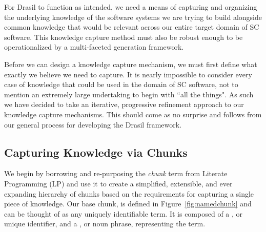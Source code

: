 For Drasil to function as intended, we need a means of capturing and organizing 
the underlying knowledge of the software systems we are trying to build 
alongside common knowledge that would be relevant across our entire target 
domain of SC software. This knowledge capture method must also be robust enough 
to be operationalized by a multi-faceted generation framework.

Before we can design a knowledge capture mechanism, we must first define what 
exactly we believe we need to capture. It is nearly impossible to consider 
every case of knowledge that could be used in the domain of SC software, not to 
mention an extremely large undertaking to begin with ``all the things". As 
such we have decided to take an iterative, progressive refinement approach to 
our knowledge capture mechanisms. This should come as no surprise and follows 
from our general process for developing the Drasil framework.

\subsection{Capturing Knowledge via Chunks}

We begin by borrowing and re-purposing the \emph{chunk} term from Literate 
Programming (LP) and use it to create a simplified, extensible, and ever 
expanding hierarchy  of chunks based on the requirements for capturing a single 
piece of knowledge. Our base chunk,  is defined in 
Figure~\ref{fig:namedchunk} and can be thought of as any uniquely identifiable 
term. It is composed of a , or unique identifier, and a 
, or noun phrase, representing the term.


